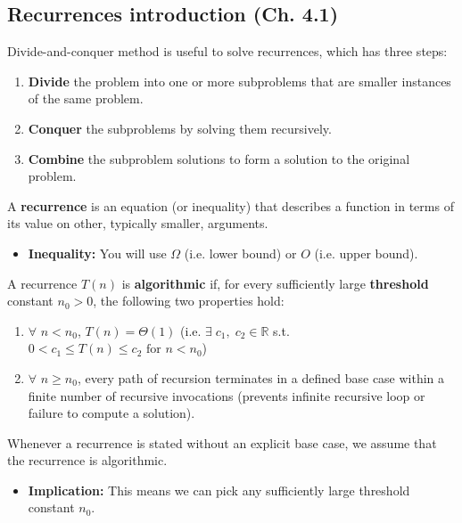 \subsection{Recurrences introduction (Ch. 4.1)}
Divide-and-conquer method is useful to solve recurrences, which has three steps: 
\begin{enumerate}
    \item \textbf{Divide} the problem into one or more subproblems that are smaller instances of the same problem.
    \item \textbf{Conquer} the subproblems by solving them recursively.
    \item \textbf{Combine} the subproblem solutions to form a solution to the original problem.
\end{enumerate}

\begin{definition}
    A \textbf{recurrence} is an equation (or inequality) that describes a function in terms of its value on other, typically smaller, arguments.
    \begin{itemize}
        \item \textbf{Inequality:} You will use $\Omega$ (i.e. lower bound) or $O$ (i.e. upper bound).
    \end{itemize}
    \vspace{1em}

    A recurrence $T(n)$ is \textbf{algorithmic} if, for every sufficiently large \textbf{threshold} constant $n_0 >0$, the following two properties hold:
    \begin{enumerate}
        \item $\forall$ $n<n_0$, $T(n) = \Theta(1)$ (i.e. $\exists \; c_1, \; c_2 \in \mathbb{R}$ s.t. $0<c_1\leq T(n) \leq c_2 \text{ for } n<n_0$)
        \item $\forall$ $n \geq n_0$, every path of recursion terminates in a defined base case within a finite number of recursive invocations (prevents infinite recursive loop or failure to compute a solution).
    \end{enumerate}
\end{definition}

\begin{intuition}
    Whenever a recurrence is stated without an explicit base case, we assume that the recurrence is algorithmic.
    \begin{itemize}
        \item \textbf{Implication:} This means we can pick any sufficiently large threshold constant $n_0$.
    \end{itemize}
\end{intuition}


